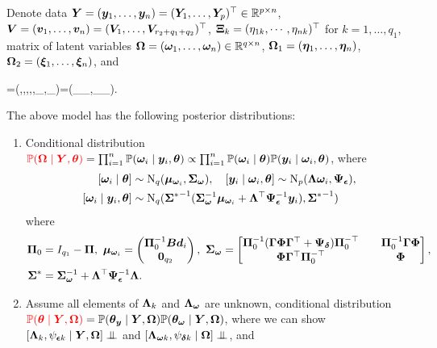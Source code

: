 \documentclass[10pt,a4paper]{book}
\begin{document}
Denote data ${\boldsymbol Y}=({\boldsymbol y}_1,\ldots,{\boldsymbol y}_n)=({\boldsymbol Y}_1,\ldots,{\boldsymbol Y}_p)^\top\in\mathbb R^{p\times n}$, ${\boldsymbol V}=({\boldsymbol v}_1,\ldots,{\boldsymbol v}_n)=({\boldsymbol V}_1,\ldots,{\boldsymbol V}_{r_2+q_1+q_2})^\top$, ${\boldsymbol\Xi}_{k}=(\eta_{1k},\cdots,\eta_{nk})^\top$ for $k=1,\ldots,q_1$, matrix of latent variables ${\boldsymbol\Omega}=({\boldsymbol\omega}_1,\ldots,{\boldsymbol\omega}_n)\in\mathbb R^{q\times n}$, ${\boldsymbol\Omega}_1=({\boldsymbol\eta}_1,\ldots,{\boldsymbol\eta}_n)$, ${\boldsymbol\Omega}_2=({\boldsymbol\xi}_1,\ldots,{\boldsymbol\xi}_n)$, and 
\begin{sequation*}
	\baq=(\baL,\B,\baP,\baG,\baF,\baY_\bae,\baY_\bad)=(\underbrace{\baL,\baY_\bae}_{\baq_\y},\underbrace{\baL_\bao,\baF,\baY_\bad}_{\baq_{\bao}}).
\end{sequation*}   
\begin{thmbox}
	\begin{proposition}\label{prop:post_linearSEM}
		The above model has the following posterior distributions:
		\begin{enumerate} 
			\item Conditional distribution $\textcolor{red}{\mathbb P({\boldsymbol\Omega}\mid{\boldsymbol Y},{\boldsymbol\theta})}=\prod_{i=1}^n\mathbb P({\boldsymbol\omega}_i\mid{\boldsymbol y}_i,{\boldsymbol\theta})\propto\prod_{i=1}^{n}\mathbb P({\boldsymbol\omega}_i\mid{\boldsymbol\theta})\mathbb P({\boldsymbol y}_i\mid{\boldsymbol\omega}_i,{\boldsymbol\theta})$, where 
			\begin{equation*}
				\begin{aligned}
					[\bao_i\mid\baq]&\sim\rmN_q(\bam_{\bao_i},\baS_\bao), \quad 
					[\y_i\mid\bao_i,\baq]\sim\rmN_{p}(\baL\bao_i,\baY_\bae),\\
					[\bao_i\mid\y_i,\baq]&\sim\rmN_q({\baS^{*}}^{-1}(\baS_{\bao}^{-1}\bam_{\bao_i}+\baL^\TT\baY_{\bae}^{-1}\y_i),{\baS^{*}}^{-1})
				\end{aligned}
			\end{equation*}
			where 
			\begin{equation*}
				\begin{aligned}
					\baP_0&=I_{q_1}-\baP, \ \bam_{\bao_i}=\begin{pmatrix}\baP_0^{-1}\B \d_i\\\0_{q_2}\end{pmatrix}, \ \baS_\bao=\begin{bmatrix}\baP_0^{-1}(\baG\baF\baG^\TT+\baY_\bad)\baP_0^{-\TT}&&\baP_0^{-1}\baG\baF\\\baF\baG^\TT\baP_0^{-\TT}&&\baF\end{bmatrix},\\
					\baS^{*}&=\baS_{\bao}^{-1}+\baL^\TT \baY_{\bae}^{-1}\baL.
				\end{aligned}
			\end{equation*}
			\item Assume all elements of ${\boldsymbol\Lambda}_k$ and ${\boldsymbol\Lambda}_{\boldsymbol\omega}$ are unknown, conditional distribution $\textcolor{red}{\mathbb P({\boldsymbol\theta}\mid{\boldsymbol Y},{\boldsymbol\Omega})}=\mathbb P({\boldsymbol\theta}_{\boldsymbol y}\mid{\boldsymbol Y},{\boldsymbol\Omega})\mathbb P({\boldsymbol\theta}_{\boldsymbol\omega}\mid{\boldsymbol Y},{\boldsymbol\Omega})$, where we can show $[\baL_k,\psi_{\bae k}\mid \Y,\baO] \indep$ and $[\baL_{\bao k},\psi_{\bad k}\mid \baO]\indep$, and  

\end{enumerate}
\end{proposition}
\end{thmbox}
\end{document}
